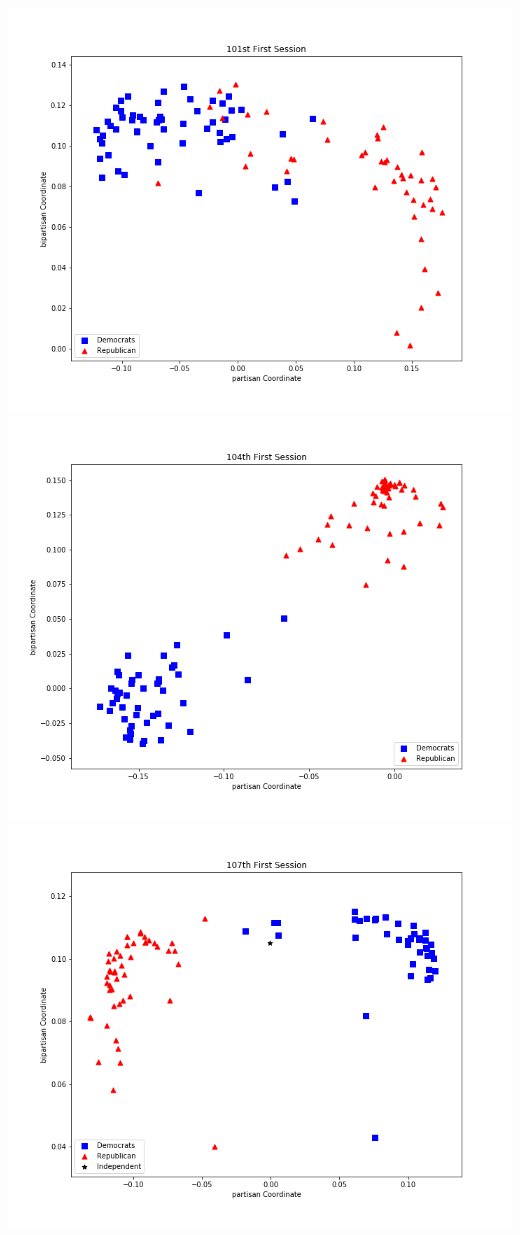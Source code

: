\documentclass[letterpaper,12pt]{article}
\begin{document}
\begin{center}
\includegraphics[scale=.25]{101st1.png}
\includegraphics[scale=.25]{104th1.png}
\includegraphics[scale=.25]{107th1.png}

\end{center}
\end{document}
